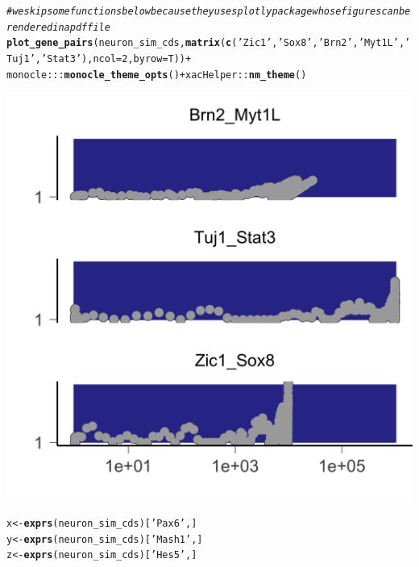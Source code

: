 \documentclass[10pt,oneside]{article}\usepackage[]{graphicx}\usepackage[]{color}
\makeatletter
\def\maxwidth{ %
  \ifdim\Gin@nat@width>\linewidth
    \linewidth
  \else
    \Gin@nat@width
  \fi
}
\newcommand{\hlnum}[1]{\textcolor[rgb]{0.686,0.059,0.569}{#1}}%
\newcommand{\hlstr}[1]{\textcolor[rgb]{0.192,0.494,0.8}{#1}}%
\newcommand{\hlcom}[1]{\textcolor[rgb]{0.678,0.584,0.686}{\textit{#1}}}%
\newcommand{\hlopt}[1]{\textcolor[rgb]{0,0,0}{#1}}%
\newcommand{\hlstd}[1]{\textcolor[rgb]{0.345,0.345,0.345}{#1}}%
\newcommand{\hlkwb}[1]{\textcolor[rgb]{0.69,0.353,0.396}{#1}}%
\newcommand{\hlkwc}[1]{\textcolor[rgb]{0.333,0.667,0.333}{#1}}%
\newcommand{\hlkwd}[1]{\textcolor[rgb]{0.737,0.353,0.396}{\textbf{#1}}}%
\newenvironment{kframe}{%
 \def\at@end@of@kframe{}%
 \ifinner\ifhmode%
  \def\at@end@of@kframe{\end{minipage}}%
  \begin{minipage}{\columnwidth}%
 \fi\fi%
 \def\FrameCommand##1{\hskip\@totalleftmargin \hskip-\fboxsep
 \colorbox{shadecolor}{##1}\hskip-\fboxsep
     \hskip-\linewidth \hskip-\@totalleftmargin \hskip\columnwidth}%
 \MakeFramed {\advance\hsize-\width
   \@totalleftmargin\z@ \linewidth\hsize
   \@setminipage}}%
 {\par\unskip\endMakeFramed%
 \at@end@of@kframe}
\newenvironment{knitrout}{}{} %
\makeatother
\begin{document}
\begin{knitrout}
\color{fgcolor}\begin{kframe}
\begin{alltt}
\hlcom{# we skip some functions below because they uses plotly package whose figures can be rendered in a pdf file }
\hlkwd{plot_gene_pairs}\hlstd{(neuron_sim_cds,} \hlkwd{matrix}\hlstd{(}\hlkwd{c}\hlstd{(}\hlstr{'Zic1'}\hlstd{,} \hlstr{'Sox8'}\hlstd{,} \hlstr{'Brn2'}\hlstd{,} \hlstr{'Myt1L'}\hlstd{,} \hlstr{'Tuj1'}\hlstd{,} \hlstr{'Stat3'}\hlstd{),} \hlkwc{ncol} \hlstd{=} \hlnum{2}\hlstd{,} \hlkwc{byrow} \hlstd{= T))} \hlopt{+}
  \hlstd{monocle}\hlopt{:::}\hlkwd{monocle_theme_opts}\hlstd{()} \hlopt{+} \hlstd{xacHelper}\hlopt{::}\hlkwd{nm_theme}\hlstd{()}
\end{alltt}
\end{kframe}

{\centering \includegraphics[width=\maxwidth]{figure/gene_pairwise_plot-1} 

}


\begin{kframe}\begin{alltt}
\hlstd{x} \hlkwb{<-} \hlkwd{exprs}\hlstd{(neuron_sim_cds)[}\hlstr{'Pax6'}\hlstd{, ]}
\hlstd{y} \hlkwb{<-} \hlkwd{exprs}\hlstd{(neuron_sim_cds)[}\hlstr{'Mash1'}\hlstd{, ]}
\hlstd{z} \hlkwb{<-} \hlkwd{exprs}\hlstd{(neuron_sim_cds)[}\hlstr{'Hes5'}\hlstd{, ]}


\end{alltt}
\end{kframe}
\end{knitrout}
\end{document}
